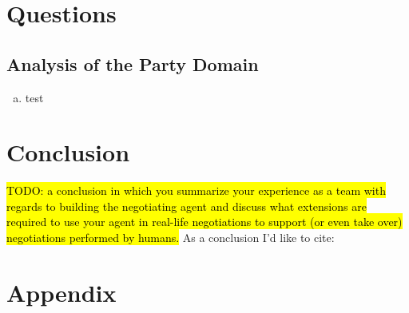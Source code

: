 \documentclass[a4paper,10pt]{article}
\newcommand{\todo}[1] {\hl{TODO: #1}}
\begin{document}
\section{Questions}
\label{sec:questions}

\subsection{Analysis of the Party Domain}

\begin{enumerate}[(a)]

\item{test}

\end{enumerate}

\section{Conclusion}
\label{sec:conclusion}
\todo{a conclusion in which you summarize your experience as a team with regards to building the negotiating agent and discuss what extensions are required to use your agent in real-life negotiations to support (or even take over) negotiations performed by humans.}
As a conclusion I'd like to cite: \cite{baarslag2012decoupling}




\newpage
\section*{Appendix}
\end{document}
